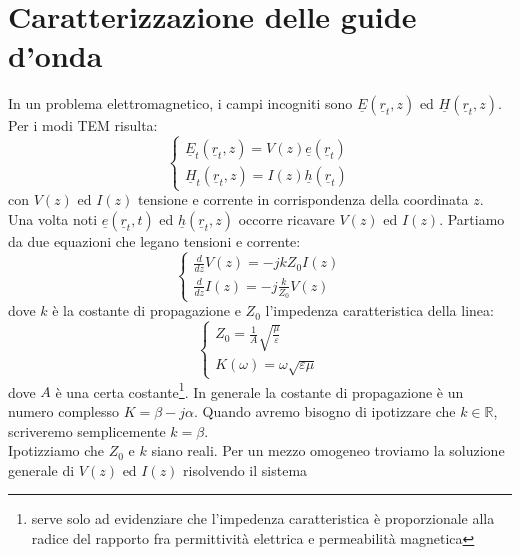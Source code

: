 \documentclass{book}
\begin{document}
    \section{Caratterizzazione delle guide d'onda}
        In un problema elettromagnetico, i campi incogniti sono $\underline{E}(\underline{r}_{t}, z)$ ed $\underline{H}(\underline{r}_{t}, z)$.
        Per i modi TEM risulta:
        \begin{equation}
            \begin{cases}
                \underline{E}_{t}(\underline{r}_{t},z)=V(z)\underline{e}(\underline{r}_{t}) \\
                \underline{H}_{t}(\underline{r}_{t},z)=I(z)\underline{h}(\underline{r}_{t})
            \end{cases}
        \end{equation}
        con $V(z)$ ed $I(z)$ tensione e corrente in corrispondenza della coordinata $z$. Una volta noti $\underline{e}(\underline{r}_{t}, t)$
        ed $\underline{h}(\underline{r}_{t},z)$ occorre ricavare $V(z)$ ed $I(z)$. Partiamo da due equazioni che legano tensioni e corrente:
        \begin{equation}
            \label{eqn:eq_tensione_corrente}
            \begin{cases}
                \frac{d}{dz}V(z)=-j k Z_{0}I(z) \\
                \frac{d}{dz}I(z) = -j \displaystyle \frac{k}{Z_{0}}V(z)
            \end{cases}
        \end{equation}
        dove $k$ è la costante di propagazione e $Z_{0}$ l'impedenza caratteristica della linea:
        \begin{equation}
            \begin{cases}
                Z_{0} = \displaystyle \frac{1}{A} \sqrt{\frac{\mu}{\varepsilon}} \\
                K(\omega)= \omega \sqrt{\varepsilon \mu}
            \end{cases}
        \end{equation}
        dove $A$ è una certa costante\footnote{serve solo ad evidenziare che l'impedenza caratteristica è proporzionale alla radice del rapporto
        fra permittività elettrica e permeabilità magnetica}. In generale la costante di propagazione è un numero complesso $K=\beta -j \alpha$. Quando
        avremo bisogno di ipotizzare che $k \in \mathbb{R}$, scriveremo semplicemente $k=\beta$. \\
        Ipotizziamo che $Z_{0}$ e $k$ siano reali. Per un mezzo omogeneo troviamo la soluzione generale di $V(z)$ ed $I(z)$ risolvendo il sistema
\end{document}
